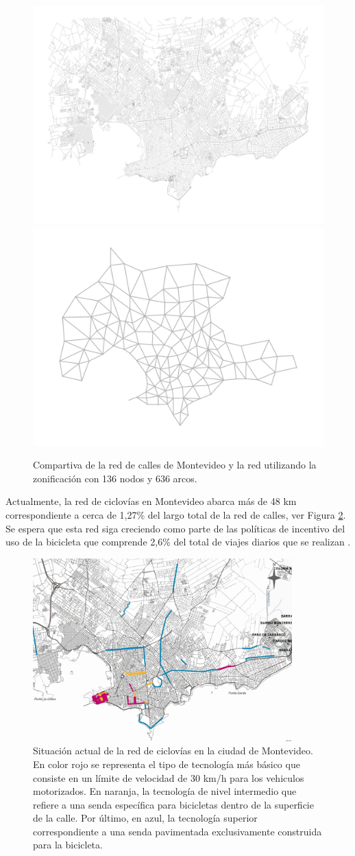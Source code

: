 \begin{figure}[h!]
  \centering
  \includegraphics[width=.49\linewidth]{../resources/montevideo_full.png}
  \includegraphics[width=.49\linewidth]{../resources/montevideo_simple.png}
  \caption{Compartiva de la red de calles de Montevideo y la red utilizando la zonificación con 136 nodos y 636 arcos.}
  \label{fig:montevideosimplification}
\end{figure}

Actualmente, la red de ciclovías en Montevideo abarca más de 48 km correspondiente a cerca de 1,27\% del largo total de la red de calles, ver Figura \ref{fig:montevideobikeways}. Se espera que esta red siga creciendo como parte de las políticas de incentivo del uso de la bicicleta que comprende 2,6\% del total de viajes diarios que se realizan \parencite{Mauttone2017a}.

\begin{figure}[h!]
  \centering
  \includegraphics[width=10cm]{../resources/bicicircuitos_montevideo.png}
  \caption{Situación actual de la red de ciclovías en la ciudad de Montevideo. En color rojo se representa el tipo de tecnología más básico que consiste en un límite de velocidad de 30 km/h para los vehiculos motorizados. En naranja, la tecnología de nivel intermedio que refiere a una senda específica para bicicletas dentro de la superficie de la calle. Por último, en azul, la tecnología superior correspondiente a una senda pavimentada exclusivamente construida para la bicicleta.}
  \label{fig:montevideobikeways}
\end{figure}

